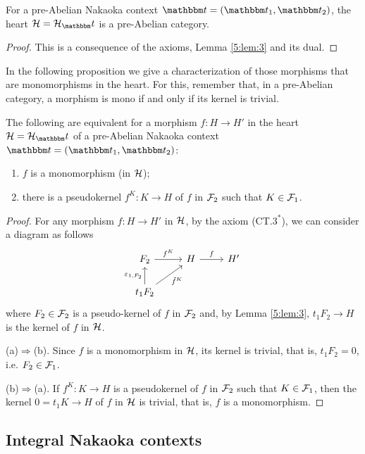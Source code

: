 \begin{thm}\label{pre_abelian_theorem}
For a pre-Abelian Nakaoka context $\t=(\t_1,\t_2)$, the heart $\clH=\clH_\t$ is a pre-Abelian category.
\end{thm}
\begin{proof}
This is a consequence of the axioms, Lemma \ref{5:lem:3} and its dual.
\end{proof}

In the following proposition we give a characterization of those morphisms that are monomorphisms in the heart. For this, remember that, in a pre-Abelian category, a morphism is mono if and only if its kernel is trivial.

\begin{prop}\label{prop:1.4}
  The following are equivalent for a morphism $f\colon H\to H'$ in the heart $\clH=\clH_\t$ of a pre-Abelian Nakaoka context $\t=(\t_1,\t_2)$:
  \begin{enumerate}[label=(\alph*)]
    \item $f$ is a monomorphism (in $\mathcal{H}$);
    \item\label{prop:1.4:b} there is a pseudokernel $f^K\colon K\to H$ of $f$ in $\mathcal{F}_2$ such that $K\in \mathcal{F}_1$.
  \end{enumerate}
\end{prop}
\begin{proof}
  For any morphism $f\colon H\to H'$ in $\mathcal{H}$, by the axiom (CT.$3^*$), we can consider a diagram as follows
  \begin{equation*}
    \begin{tikzcd}
      F_2\arrow{r}{f^K} & H\arrow{r}{f} & H'\\
      t_1{F_2}\arrow{u}{\varepsilon_{1,F_2}}\arrow{ur}[']{\tilde{f}^K}
    \end{tikzcd}
  \end{equation*}
  where $F_2\in \mathcal{F}_2$ is a pseudo-kernel of $f$ in $\mathcal{F}_2$ and, by Lemma \ref{5:lem:3}, $t_1F_2\to H$ is the kernel of $f$ in $\mathcal{H}$.

  \smallskip\noindent
  (a)$\Rightarrow$(b). Since $f$ is a monomorphism in $\mathcal{H}$, its kernel is trivial, that is, $t_1F_2=0$, i.e. $F_2\in \mathcal{F}_1$.

  \smallskip\noindent
  (b)$\Rightarrow$(a). If  $f^K\colon K\to H$ is a pseudokernel of $f$ in $\mathcal{F}_2$ such that $K\in \mathcal{F}_1$, then the kernel $0=t_1K\to H$ of $f$ in $\mathcal{H}$ is trivial, that is, $f$ is a monomorphism.
\end{proof}

\subsection{Integral Nakaoka contexts}

